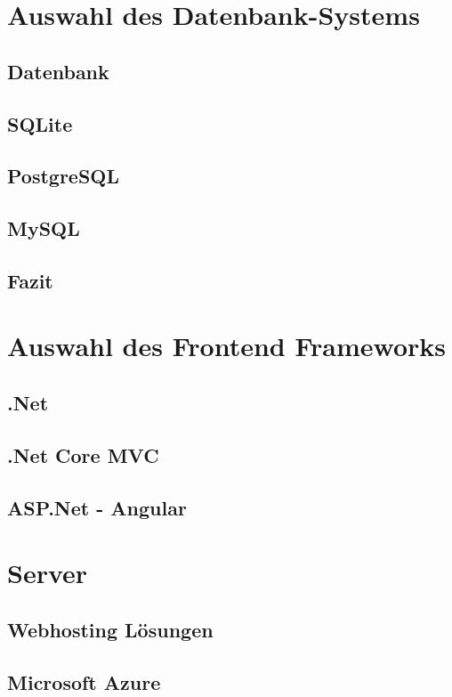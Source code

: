 \section{Auswahl des Datenbank-Systems}
    
    \subsection{Datenbank}
        
    \subsection{SQLite}
        
        \newpage
    \subsection{PostgreSQL}
        
    \subsection{MySQL}
        
        \newpage
    \subsection{Fazit}
    \lipsum[5-8]
\section{Auswahl des Frontend Frameworks}
    \lipsum[5-12]
    \subsection{.Net}
        \lipsum[5-12]
    \subsection{.Net Core MVC}
        \lipsum[5-12]
    \subsection{ASP.Net - Angular}
        \lipsum[5-12]
\section{Server}
    \lipsum[5-12]
    \subsection{Webhosting Lösungen}
        \lipsum[5-12]
    \subsection{Microsoft Azure}
        \lipsum[5-12]
